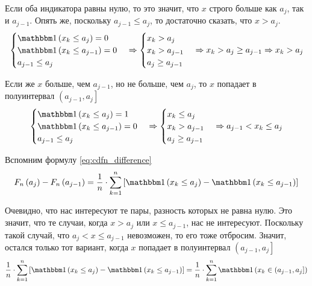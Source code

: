 Если оба индикатора равны нулю,
то это значит, что $x$ строго больше как $a_j$, так и $a_{j-1}$.
Опять же, поскольку $a_{j-1}\le a_j$, то достаточно сказать, что $x>a_j$.
\begin{align*}
    \begin{cases}
        \indicator{x_k\le a_j}=0\\
        \indicator{x_k\le a_{j-1}}=0\\
        a_{j-1}\le a_j
    \end{cases}
    \Rightarrow
    \begin{cases}
        x_k>a_j\\
        x_k>a_{j-1}\\
        a_j\ge a_{j-1}
    \end{cases}
    \Rightarrow
        x_k>a_j\ge a_{j-1}
    \Rightarrow
        x_k>a_j
\end{align*}

Если же $x$ больше, чем $a_{j-1}$, но не больше, чем $a_j$,
то $x$ попадает в полуинтервал $\left(a_{j-1},a_j\right]$
\begin{align*}
    \begin{cases}
        \indicator{x_k\le a_j}=1\\
        \indicator{x_k\le a_{j-1}}=0\\
        a_{j-1}\le a_j
    \end{cases}
    \Rightarrow
    \begin{cases}
        x_k\le a_j\\
        x_k>a_{j-1}\\
        a_j\ge a_{j-1}
    \end{cases}
    \Rightarrow
        a_{j-1}<x_k\le a_j
\end{align*}

Вспомним формулу \eqref{eq:cdfn_difference}
$$\cdfn{a_j}-\cdfn{a_{j-1}}
=\frac{1}{n}\cdot \sum_{k=1}^n
    \left[\indicator{x_k\le a_j}-\indicator{x_k\le a_{j-1}}\right]$$

Очевидно, что нас интересуют те пары, разность которых не равна нулю.
Это значит, что те случаи, когда $x>a_j$ или $x\le a_{j-1}$, нас не интересуют.
Поскольку такой случай, что $a_j<x\le a_{j-1}$ невозможен, то его тоже отбросим.
Значит, остался только тот вариант,
когда $x$ попадает в полуинтервал $\left(a_{j-1},a_j\right]$
$$\frac{1}{n}\cdot \sum_{k=1}^n
        \left[\indicator{x_k\le a_j}-\indicator{x_k\le a_{j-1}}\right]
    =\frac{1}{n}\cdot \sum_{k=1}^n \indicator{x_k\in \left(a_{j-1},a_j\right]}
$$

